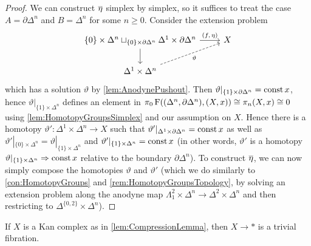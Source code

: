 \begin{proof}
	We can construct $\ov\eta$ simplex by simplex, so it suffices to treat the case $A=\partial\Delta^n$ and $B=\Delta^n$ for some $n\geqslant 0$. Consider the extension problem
	\begin{equation*}
		\begin{tikzcd}
			\{0\}\times\Delta^n\sqcup_{\{0\}\times\partial\Delta^n}\Delta^1\times\partial\Delta^n\rar["{(f,\,\eta)}"]\dar & X\\
			\Delta^1\times\Delta^n\urar[dashed,"\vartheta"'] & 
		\end{tikzcd}
	\end{equation*}
	which has a solution $\vartheta$ by \cref{lem:AnodynePushout}. Then $\vartheta|_{\{1\}\times\partial\Delta^n}=\operatorname{const} x$, hence $\vartheta|_{\{1\}\times\Delta^n}$ defines an element in $\pi_0\operatorname{F}((\Delta^n,\partial\Delta^n),(X,x))\cong \pi_n(X,x)\cong0$ using \cref{lem:HomotopyGroupsSimplex} and our assumption on $X$. Hence there is a homotopy $\vartheta'\colon \Delta^1\times\Delta^n\rightarrow X$ such that $\vartheta'|_{\Delta^1\times\partial\Delta^n}=\operatorname{const} x$ as well as $\vartheta'|_{\{0\}\times\Delta^n}=\vartheta|_{\{1\}\times\Delta^n}$ and $\vartheta'|_{\{1\}\times\Delta^n}=\operatorname{const} x$ (in other words, $\vartheta'$ is a homotopy $\vartheta|_{\{1\}\times\Delta^n}\Rightarrow \operatorname{const} x$ relative to the boundary $\partial \Delta^n$). To construct $\ov\eta$, we can now simply compose the homotopies $\vartheta$ and $\vartheta'$ (which we do similarly to \cref{con:HomotopyGroups} and \cref{rem:HomotopyGroupsTopology}, by solving an extension problem along the anodyne map $\Lambda_1^2\times\Delta^n\rightarrow\Delta^2\times\Delta^n$ and then restricting to $\Delta^{\{0,2\}}\times \Delta^n$).
\end{proof}
\begin{lem}\label{lem:ContractibleKanComplex}
	If $X$ is a Kan complex as in \cref{lem:CompressionLemma}, then $X\rightarrow *$ is a trivial fibration.
\end{lem}
